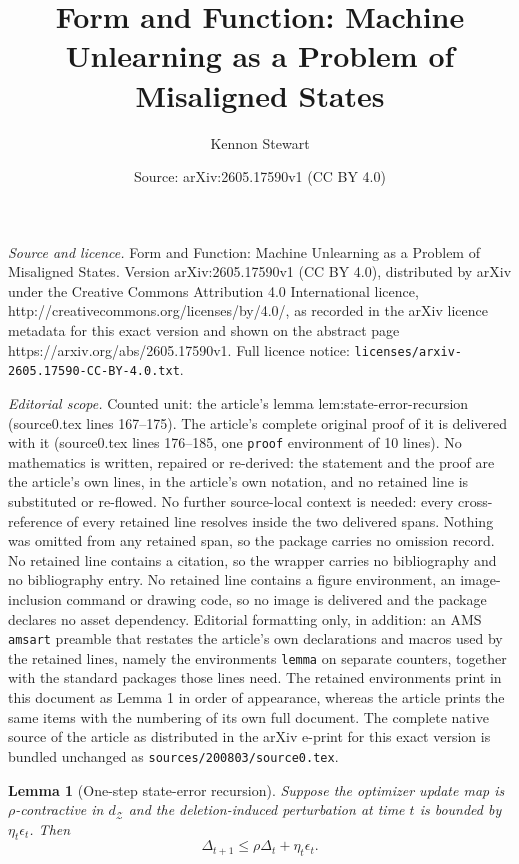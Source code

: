 \documentclass[10pt,a4paper]{amsart}
\title{Form and Function: Machine Unlearning as a Problem of Misaligned States}
\author{Kennon Stewart}
\date{Source: arXiv:2605.17590v1 (CC BY 4.0)}
\newtheorem{lemma}{Lemma}
\begin{document}
\maketitle

\noindent\emph{Source and licence.} Form and Function: Machine Unlearning as a Problem of Misaligned States. Version arXiv:2605.17590v1 (CC BY 4.0), distributed by arXiv under the Creative Commons Attribution 4.0 International licence, http://creativecommons.org/licenses/by/4.0/, as recorded in the arXiv licence metadata for this exact version and shown on the abstract page https://arxiv.org/abs/2605.17590v1. Full licence notice: \texttt{licenses/arxiv-2605.17590-CC-BY-4.0.txt}.\par\smallskip

\noindent\textit{Editorial scope.} Counted unit: the article's lemma lem:state-error-recursion (source0.tex lines 167--175). The article's complete original proof of it is delivered with it (source0.tex lines 176--185, one \texttt{proof} environment of 10 lines). No mathematics is written, repaired or re-derived: the statement and the proof are the article's own lines, in the article's own notation, and no retained line is substituted or re-flowed.  No further source-local context is needed: every cross-reference of every retained line resolves inside the two delivered spans.  Nothing was omitted from any retained span, so the package carries no omission record.  No retained line contains a citation, so the wrapper carries no bibliography and no bibliography entry.  No retained line contains a figure environment, an image-inclusion command or drawing code, so no image is delivered and the package declares no asset dependency.  Editorial formatting only, in addition: an AMS \texttt{amsart} preamble that restates the article's own declarations and macros used by the retained lines, namely the environments \texttt{lemma} on separate counters, together with the standard packages those lines need.  The retained environments print in this document as Lemma 1 in order of appearance, whereas the article prints the same items with the numbering of its own full document.  The complete native source of the article as distributed in the arXiv e-print for this exact version is bundled unchanged as \texttt{sources/200803/source0.tex}.
\begin{lemma}[One-step state-error recursion]
\label{lem:state-error-recursion}
Suppose the optimizer update map is $\rho$-contractive in $d_{\mathcal Z}$ and the deletion-induced perturbation at time $t$ is bounded by $\eta_t\epsilon_t$. Then
$$
\Delta_{t+1}
\le
\rho \Delta_t + \eta_t\epsilon_t.
$$
\end{lemma}
\end{document}
